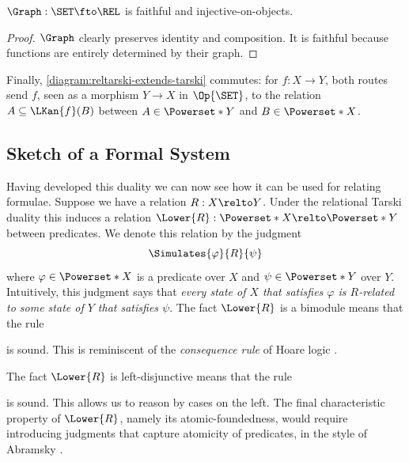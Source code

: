 \documentclass[a4paper,UKenglish,cleveref, autoref]{lipics-v2021}
\begin{document}
\begin{lemma}
  \(\Graph : \SET \fto \REL\) is faithful and injective-on-objects.
\end{lemma}
\begin{proof}
  \(\Graph\) clearly preserves identity and composition. It is faithful because
  functions are entirely determined by their graph.
\end{proof}

Finally, \eqref{diagram:reltarski-extends-tarski} commutes: for
\(f : X \to Y\), both routes send \(f\), seen as a morphism
\(Y \to X\) in \(\Op{\SET}\), to the relation
\(A \subseteq \LKan{f}(B)\) between \(A \in \Powerset*{Y}\) and
\(B \in \Powerset*{X}\).

\subsection{Sketch of a Formal System}

Having developed this duality we can now see how it can be used for relating
formulae. Suppose we have a relation $R : X \relto Y$. Under the relational
Tarski duality this induces a relation
$\Lower{R} : \Powerset*{X} \relto \Powerset*{Y}$ between predicates. We denote
this relation by the judgment
\[
  \Simulates{\varphi}{R}{\psi}
\]
where $\varphi \in \Powerset*{X}$ is a predicate over $X$ and
$\psi \in \Powerset*{Y}$ over $Y$. Intuitively, this judgment says that
\emph{every state of $X$ that satisfies $\varphi$ is $R$-related to some state
of $Y$ that satisfies $\psi$}. The fact $\Lower{R}$ is a bimodule means that the
rule
\begin{mathpar}
\end{mathpar}
is sound. This is reminiscent of the \emph{consequence rule} of Hoare logic
\cite{hoare_1969}.

The fact $\Lower{R}$ is left-disjunctive means that the rule
\begin{mathpar}
\end{mathpar}
is sound. This allows us to reason by cases on the left. The final
characteristic property of $\Lower{R}$, namely its atomic-foundedness, would
require introducing judgments that capture atomicity of predicates, in the
style of Abramsky \cite{abramsky_1991}.
\end{document}
